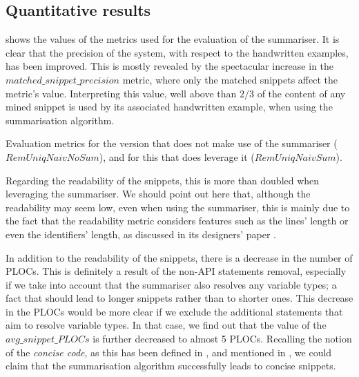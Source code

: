 \subsection{Quantitative results}
\label{subsec:evaluation-exp1-quantitative}

 shows the values of the metrics used for the evaluation of the summariser. It is clear that the precision of the system, with respect to the handwritten examples, has been improved. This is mostly revealed by the spectacular increase in the $matched\_snippet\_precision$ metric, where only the matched snippets affect the metric's value. Interpreting this value, well above than $2/3$ of the content of any mined snippet is used by its associated handwritten example, when using the summarisation algorithm.

\begin{table}[ht]
\centering
\small
\caption[Evaluation metrics\protect\\($RemUniqNaivNoSum$, $RemUniqNaivSum$)]{Evaluation metrics for the version that does not make use of the summariser ($RemUniqNaivNoSum$), and for this that does leverage it ($RemUniqNaivSum$).}
\label{tables:evaluation-summariser}

\end{table}

Regarding the readability of the snippets, this is more than doubled when leveraging the summariser. We should point out here that, although the readability may seem low, even when using the summariser, this is mainly due to the fact that the readability metric considers features such as the lines' length or even the identifiers' length, as discussed in its designers' paper \cite{Buse:2008}.

In addition to the readability of the snippets, there is a decrease in the number of PLOCs. This is definitely a result of the non-API statements removal, especially if we take into account that the summariser also resolves any variable types; a fact that should lead to longer snippets rather than to shorter ones. This decrease in the PLOCs would be more clear if we exclude the additional statements that aim to resolve variable types. In that case, we find out that the value of the $avg\_snippet\_PLOCs$ is further decreased to almost 5 PLOCs. Recalling the notion of the \textit{concise code}, as this has been defined in \cite{Nasehi:2012}, and mentioned in , we could claim that the summarisation algorithm successfully leads to concise snippets.


